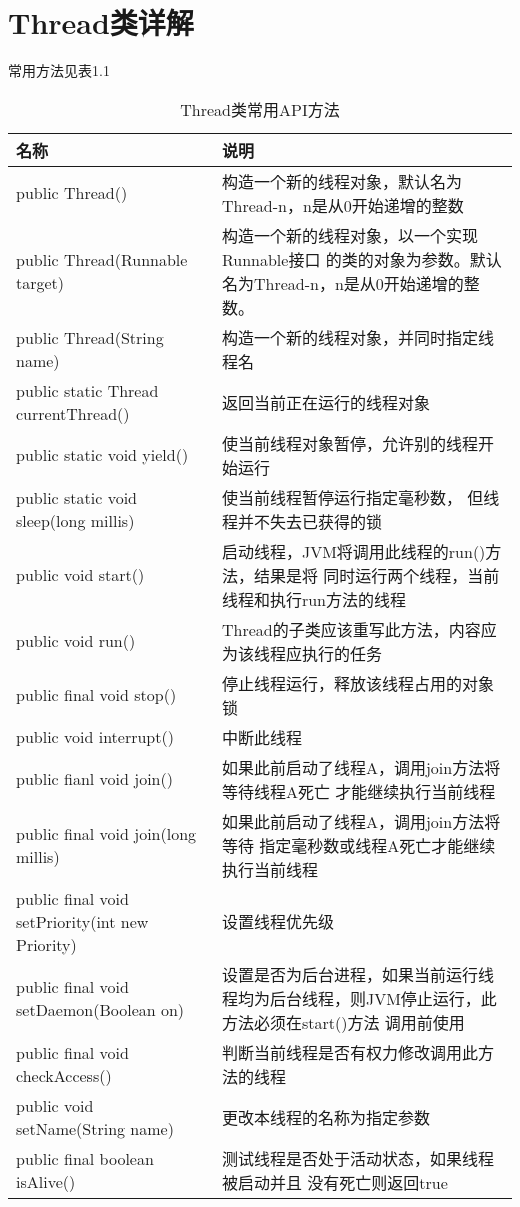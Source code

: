 \section{Thread类详解}
常用方法见表1.1
\begin{table}[!h]
	\centering
	\caption{Thread类常用API方法}
	\begin{tabular}{|p{}|p{}|}%
		\hline
		名称&说明\\
		\hline
		public Thread()&构造一个新的线程对象，默认名为Thread-n，n是从0开始递增的整数\\
		\hline
		public Thread(Runnable target)&构造一个新的线程对象，以一个实现Runnable接口
		的类的对象为参数。默认名为Thread-n，n是从0开始递增的整数。\\
		\hline
		public Thread(String name)&构造一个新的线程对象，并同时指定线程名\\
		\hline
		public static Thread currentThread()&返回当前正在运行的线程对象\\
		\hline
		public static void yield()&使当前线程对象暂停，允许别的线程开始运行\\
		\hline
		public static void sleep(long millis)&使当前线程暂停运行指定毫秒数，
		但线程并不失去已获得的锁\\
		\hline
		public void start()&启动线程，JVM将调用此线程的run()方法，结果是将
		同时运行两个线程，当前线程和执行run方法的线程\\
		\hline
		public void run()&Thread的子类应该重写此方法，内容应为该线程应执行的任务\\
		\hline
		public final void stop()&停止线程运行，释放该线程占用的对象锁\\
		\hline
		public void interrupt()&中断此线程\\
		\hline
		public fianl void join()&如果此前启动了线程A，调用join方法将等待线程A死亡
		才能继续执行当前线程\\
		\hline
		public final void join(long millis)&如果此前启动了线程A，调用join方法将等待
		指定毫秒数或线程A死亡才能继续执行当前线程\\
		\hline
		public final void setPriority(int new Priority)&设置线程优先级\\
		\hline
		public final void setDaemon(Boolean on)&设置是否为后台进程，如果当前运行线程均为后台线程，则JVM停止运行，此方法必须在start()方法
		调用前使用\\
		\hline
		public final void checkAccess()&判断当前线程是否有权力修改调用此方法的线程\\
		\hline
		public void setName(String name)&更改本线程的名称为指定参数\\
		\hline
		public final boolean isAlive()&测试线程是否处于活动状态，如果线程被启动并且
		没有死亡则返回true\\
		\hline
	\end{tabular}
\end{table}
